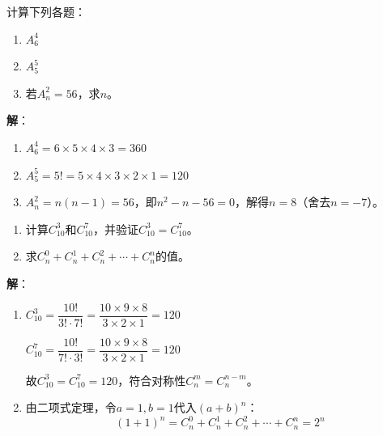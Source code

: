 \documentclass[12pt, a4paper]{ctexart}
\begin{document}
\begin{examplebox}[【例题3】排列数的计算]
计算下列各题：
\begin{enumerate}[label=(\arabic*)]
  \item $A_6^4$
  \item $A_5^5$
  \item 若$A_n^2 = 56$，求$n$。
\end{enumerate}

\textbf{解}：
\begin{enumerate}[label=(\arabic*)]
  \item $A_6^4 = 6 \times 5 \times 4 \times 3 = 360$
  \item $A_5^5 = 5! = 5 \times 4 \times 3 \times 2 \times 1 = 120$
  \item $A_n^2 = n(n-1) = 56$，即$n^2 - n - 56 = 0$，解得$n = 8$（舍去$n = -7$）。
\end{enumerate}
\end{examplebox}

\begin{examplebox}[【例题4】组合数计算与恒等式证明]
\begin{enumerate}[label=(\arabic*)]
  \item 计算$C_{10}^3$和$C_{10}^7$，并验证$C_{10}^3 = C_{10}^7$。
  \item 求$C_n^0 + C_n^1 + C_n^2 + \cdots + C_n^n$的值。
\end{enumerate}

\textbf{解}：
\begin{enumerate}[label=(\arabic*)]
  \item $C_{10}^3 = \dfrac{10!}{3! \cdot 7!} = \dfrac{10 \times 9 \times 8}{3 \times 2 \times 1} = 120$

  $C_{10}^7 = \dfrac{10!}{7! \cdot 3!} = \dfrac{10 \times 9 \times 8}{3 \times 2 \times 1} = 120$

  故$C_{10}^3 = C_{10}^7 = 120$，符合对称性$C_n^m = C_n^{n-m}$。

  \item 由二项式定理，令$a = 1, b = 1$代入$(a+b)^n$：
  \[
  (1+1)^n = C_n^0 + C_n^1 + C_n^2 + \cdots + C_n^n = 2^n
  \]
\end{enumerate}
\end{examplebox}
\end{document}
